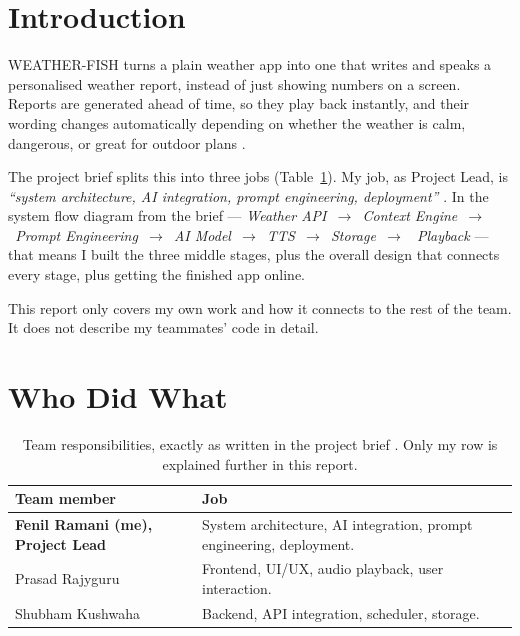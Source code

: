 \documentclass[11pt, a4paper]{article}
\begin{document}
\section{Introduction}

WEATHER-FISH turns a plain weather app into one that writes and speaks a personalised
weather report, instead of just showing numbers on a screen. Reports are generated ahead of
time, so they play back instantly, and their wording changes automatically depending on
whether the weather is calm, dangerous, or great for outdoor plans \citep{weatherfish2026}.

The project brief splits this into three jobs (Table~\ref{tab:boundary}). My job, as
Project Lead, is \textit{``system architecture, AI integration, prompt engineering,
deployment''} \citep{weatherfish2026}. In the system flow diagram from the brief ---
\textit{Weather API~$\rightarrow$~Context Engine~$\rightarrow$~Prompt
Engineering~$\rightarrow$~AI Model~$\rightarrow$~TTS~$\rightarrow$~Storage~$\rightarrow$~
Playback} --- that means I built the three middle stages, plus the overall design that
connects every stage, plus getting the finished app online.

This report only covers my own work and how it connects to the rest of the team. It does
not describe my teammates' code in detail.

\section{Who Did What}

\begin{table}[H]
  \centering
  \caption{Team responsibilities, exactly as written in the project brief
           \citep{weatherfish2026}. Only my row is explained further in this report.}
  \label{tab:boundary}
  \begin{tabularx}{\linewidth}{@{}lX@{}}
    \toprule
    \textbf{Team member} & \textbf{Job} \\
    \midrule
    \textbf{Fenil Ramani (me), Project Lead} & System architecture, AI integration,
      prompt engineering, deployment. \\[3pt]
    Prasad Rajyguru & Frontend, UI/UX, audio playback, user interaction. \\[3pt]
    Shubham Kushwaha & Backend, API integration, scheduler, storage. \\
    \bottomrule
  \end{tabularx}
\end{table}
\end{document}
